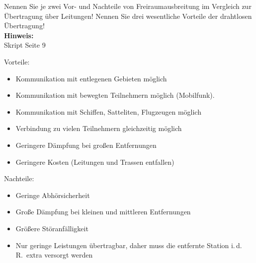 \begin{question}[section=1,name={Freiraumausbreitung},difficulty=,quantity=2,type=thr,tags={20131024,20130314}]
	Nennen Sie je zwei Vor- und Nachteile von Freiraumausbreitung im Vergleich zur Übertragung über Leitungen! Nennen Sie drei wesentliche Vorteile der drahtlosen Übertragung!
	\\ \textbf{Hinweis:}\\
	Skript Seite 9
\end{question}
\begin{solution}
	Vorteile:
	\begin{itemize}
		\item{Kommunikation mit entlegenen Gebieten möglich}
		\item{Kommunikation mit bewegten Teilnehmern möglich (Mobilfunk).}
		\item{Kommunikation mit Schiffen, Satteliten, Flugzeugen möglich}
		\item{Verbindung zu vielen Teilnehmern gleichzeitig möglich}
		\item{Geringere Dämpfung bei großen Entfernungen}
		\item{Geringere Kosten (Leitungen und Trassen entfallen)}
	\end{itemize}
	Nachteile:
	\begin{itemize}
		\item{Geringe Abhörsicherheit}
		\item{Große Dämpfung bei kleinen und mittleren Entfernungen}
		\item{Größere Störanfälligkeit}
		\item{Nur geringe Leistungen übertragbar, daher muss die entfernte Station i.\,d.\,R.\ extra versorgt werden}
	\end{itemize}
\end{solution}